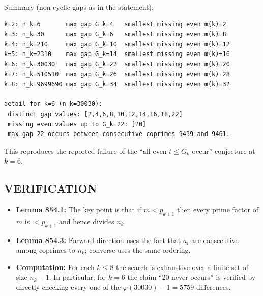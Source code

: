 Summary (non-cyclic gaps as in the statement):
\begin{verbatim}
k=2: n_k=6       max gap G_k=4   smallest missing even m(k)=2
k=3: n_k=30      max gap G_k=6   smallest missing even m(k)=8
k=4: n_k=210     max gap G_k=10  smallest missing even m(k)=12
k=5: n_k=2310    max gap G_k=14  smallest missing even m(k)=16
k=6: n_k=30030   max gap G_k=22  smallest missing even m(k)=20
k=7: n_k=510510  max gap G_k=26  smallest missing even m(k)=28
k=8: n_k=9699690 max gap G_k=34  smallest missing even m(k)=32

detail for k=6 (n_k=30030):
 distinct gap values: [2,4,6,8,10,12,14,16,18,22]
 missing even values up to G_k=22: [20]
 max gap 22 occurs between consecutive coprimes 9439 and 9461.
\end{verbatim}
This reproduces the reported failure of the ``all even $t\le G_k$ occur'' conjecture at $k=6$.

\subsection*{VERIFICATION}
\begin{itemize}
\item \textbf{Lemma 854.1:} The key point is that if $m<p_{k+1}$ then every prime factor of $m$ is $<p_{k+1}$ and hence divides $n_k$.
\item \textbf{Lemma 854.3:} Forward direction uses the fact that $a_i$ are consecutive among coprimes to $n_k$; converse uses the same ordering.
\item \textbf{Computation:} For each $k\le 8$ the search is exhaustive over a finite set of size $n_k-1$. In particular, for $k=6$ the claim ``20 never occurs'' is verified by directly checking every one of the $\varphi(30030)-1=5759$ differences.
\end{itemize}

